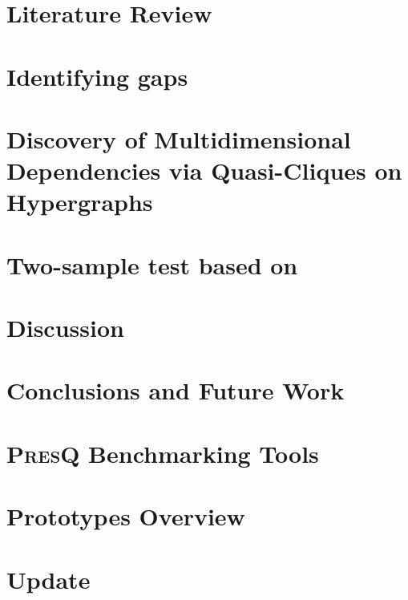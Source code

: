 \documentclass[12pt]{book}
\newcommand{\PresQ}[0]{\textsc{PresQ}\xspace}
\begin{document}
\chapter{Literature Review}
\label{chapter:literature_review}


\chapter{Identifying gaps}
\label{chapter:diverse}


\chapter{Discovery of Multidimensional Dependencies via Quasi-Cliques on Hypergraphs}
\label{chapter:presq}


\chapter{Two-sample test based on }
\label{chapter:som}


\chapter{Discussion}
\label{chapter:discussion}


\chapter{Conclusions and Future Work}
\label{chapter:conclusions}


\printbibliography[heading=bibintoc,segment=0]

\appendix
\begin{refsection}

\chapter{\PresQ Benchmarking Tools}
\label{appendix:presq_benchmarks}


\chapter{Prototypes Overview}
\label{appendix:prototypes}


\printbibliography[segment=\therefsegment]
\end{refsection}

\chapter{ Update}
\label{chapter:ide_update}

\end{document}
